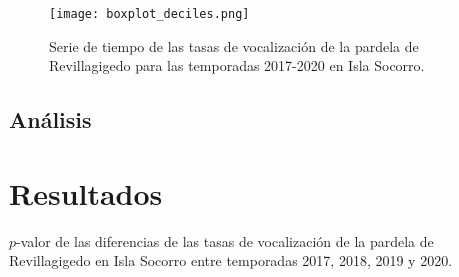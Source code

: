 \documentclass{article}
\begin{document}
\begin{figure}[H]
    \texttt{[image: boxplot\_deciles.png]}
    \caption{Serie de tiempo de las tasas de vocalización de la pardela de Revillagigedo para las 
    temporadas 2017-2020 en Isla Socorro.}
    \label{fig:serieTasasVocalizaciones}
\end{figure}

\subsection*{Análisis}


\section*{Resultados}
\begin{table}[H]
\centering
\caption{$p$-valor de las diferencias de las tasas de vocalización de la pardela de Revillagigedo 
en Isla Socorro entre temporadas 2017, 2018, 2019 y 2020.}
\label{table:diferenciasTasas}
\end{table}

 

\end{document}
